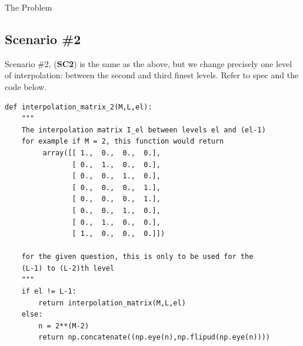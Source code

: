 \documentclass[10pt]{article}
\theoremstyle{definition}
\begin{document}
\begin{section}{The Problem}
\subsection{Scenario \#2}
Scenario \#2, (\textbf{SC2}) is the same as the above, but we change precisely one level of interpolation: between the second and third finest levels. Refer to spec and the code below.
\begin{lstlisting}
def interpolation_matrix_2(M,L,el):
    """
    The interpolation matrix I_el between levels el and (el-1)
    for example if M = 2, this function would return
         array([[ 1.,  0.,  0.,  0.],
                [ 0.,  1.,  0.,  0.],
                [ 0.,  0.,  1.,  0.],
                [ 0.,  0.,  0.,  1.],
                [ 0.,  0.,  0.,  1.],
                [ 0.,  0.,  1.,  0.],
                [ 0.,  1.,  0.,  0.],
                [ 1.,  0.,  0.,  0.]])

    for the given question, this is only to be used for the
    (L-1) to (L-2)th level
    """
    if el != L-1:
        return interpolation_matrix(M,L,el)
    else:
        n = 2**(M-2)
        return np.concatenate((np.eye(n),np.flipud(np.eye(n))))

\end{lstlisting}
\end{section}
\end{document}
